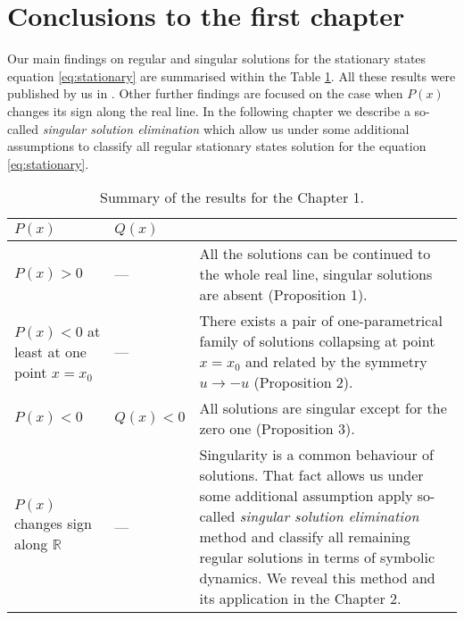 \section{Conclusions to the first chapter}

Our main findings on regular and singular solutions for the stationary states equation \eqref{eq:stationary} are summarised within the Table \ref{tab:first-chapter-results}.
All these results were published by us in \cite{AlfimovLebedev}.
Other further findings are focused on the case when $P(x)$ changes its sign along the real line.
In the following chapter we describe a so-called {\it singular solution elimination} which allow us under some additional assumptions to classify all regular stationary states solution for the equation \eqref{eq:stationary}.

\begin{table}[h!]
	\centering
	\begin{tabular}{ | p{4cm} | l || p{10cm} | }
		\hline
		$P(x)$ & $Q(x)$ & \\
		\hline
		$P(x) > 0$ & --- & All the solutions can be continued to the whole real line, singular solutions are absent (Proposition 1). \\
		\hline
		$P(x) < 0$ at least at one point $x = x_0$ & --- & There exists a pair of one-parametrical family of solutions collapsing at point $x = x_0$ and related by the symmetry $u \to -u$ (Proposition 2). \\
		\hline
		$P(x) < 0$ & $Q(x) < 0$ & All solutions are singular except for the zero one (Proposition 3). \\
		\hline
		$P(x)$ changes sign along $\mathbb{R}$ & --- & Singularity is a common behaviour of solutions.
		That fact allows us under some additional assumption apply so-called {\it singular solution elimination} method and classify all remaining regular solutions in terms of symbolic dynamics.
		We reveal this method and its application in the Chapter 2. \\
		\hline
	\end{tabular}
	\caption{Summary of the results for the Chapter 1.}
	\label{tab:first-chapter-results}
\end{table}
